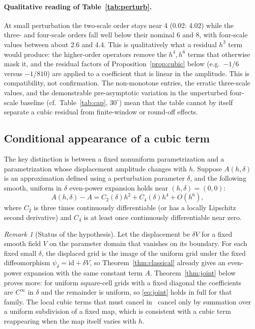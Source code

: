 \documentclass[11pt]{article}
\theoremstyle{remark}
\newtheorem{remark}{Remark}
\begin{document}
\paragraph{Qualitative reading of Table~\ref{tab:perturb}.}
At small perturbation the two-scale order stays near 4 (0.02: 4.02) while the three- and
four-scale orders fall well below their nominal 6 and 8, with four-scale values between about
2.6 and 4.4. This is qualitatively what a residual $h^3$ term would produce: the higher-order
operators remove the $h^4,h^6$ terms that otherwise mask it, and the residual factors of
Proposition~\ref{prop:cubic} below (e.g.\ $-1/6$ versus $-1/810$) are applied to a coefficient
that is linear in the amplitude. This is compatibility, not confirmation. The non-monotone
entries, the erratic three-scale values, and the demonstrable pre-asymptotic variation in the
unperturbed four-scale baseline (cf.\ Table~\ref{tab:cap}, $30^\circ$) mean that the table
cannot by itself separate a cubic residual from finite-window or round-off effects.

\subsection{Conditional appearance of a cubic term}
The key distinction is between a fixed nonuniform parametrization and a parametrization whose
displacement amplitude changes with $h$. Suppose $A(h,\delta)$ is an approximation defined
using a perturbation parameter $\delta$, and the following smooth, uniform in $\delta$
even-power expansion holds near $(h,\delta)=(0,0)$:
\begin{equation}\label{eq:joint}
A(h,\delta)-A=C_2(\delta)h^2+C_4(\delta)h^4+O(h^6),
\end{equation}
where $C_2$ is three times continuously differentiable (or has a locally Lipschitz second
derivative) and $C_4$ is at least once continuously differentiable near zero.

\begin{remark}[Status of the hypothesis]\label{rem:supplies}
Let the displacement be $\delta V$ for a fixed smooth field $V$ on the parameter domain that
vanishes on its boundary. For each fixed small $\delta$, the displaced grid is the image of
the uniform grid under the fixed diffeomorphism $\psi_\delta=\mathrm{id}+\delta V$, so
Theorem~\ref{thm:classical} already gives an even-power expansion with the same constant term
$A$. Theorem~\ref{thm:joint} below proves more: for uniform square-cell grids with a fixed
diagonal the coefficients are $C^\infty$ in $\delta$ and the remainder is uniform, so
\eqref{eq:joint} holds in full for that family. The local cubic terms that must cancel
in~\cite{georgtausch} cancel only by summation over a uniform subdivision of a fixed map,
which is consistent with a cubic term reappearing when the map itself varies with $h$.
\end{remark}
\end{document}
